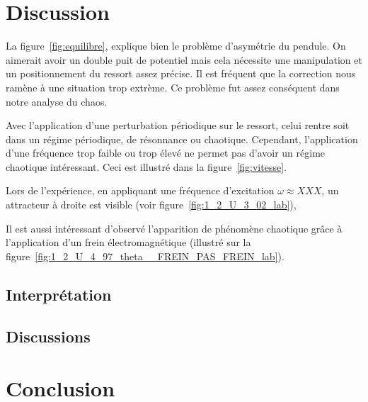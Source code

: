 \documentclass[a4paper,12pt,oneside]{article}
\begin{document}
\section{Discussion}%

La figure~\ref{fig:equilibre}, explique bien le problème d'asymétrie du pendule. On aimerait avoir un double puit de potentiel mais cela nécessite une manipulation et un positionnement du ressort assez précise. Il est fréquent que la correction nous ramène à une situation trop extrème. Ce problème fut assez conséquent dans notre analyse du chaos.

Avec l'application d'une perturbation périodique sur le ressort, celui rentre soit dans un régime périodique, de résonnance ou chaotique. Cependant, l'application d'une fréquence trop faible ou trop élevé ne permet pas d'avoir un régime chaotique intéressant. Ceci est illustré dans la figure~\ref{fig:vitesse}.

Lors de l'expérience, en appliquant une fréquence d'excitation $\omega \approx XXX$, un attracteur à droite est visible (voir figure~\ref{fig:1_2_U_3_02_lab}), %

Il est aussi intéressant d'observé l'apparition de phénomène chaotique grâce à l'application d'un frein électromagnétique (illustré sur la figure~\ref{fig:1_2_U_4_97_theta__FREIN_PAS_FREIN_lab}). %
\subsection{Interprétation}

\subsection{Discussions}
\section{Conclusion}






\begin{thebibliography}{99}
\end{thebibliography}
\end{document}
